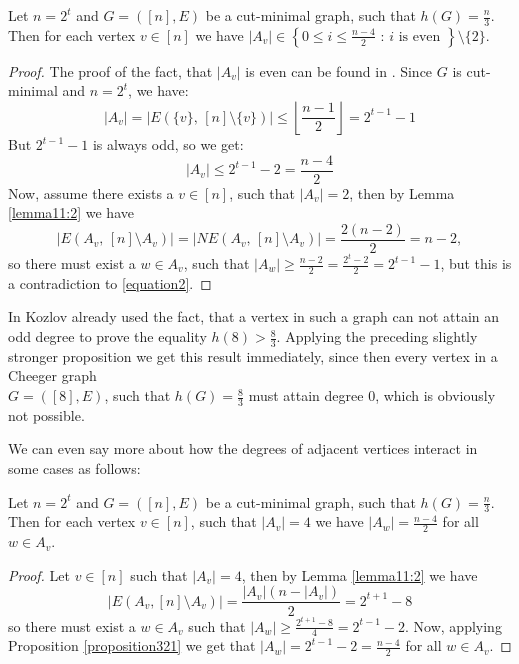 \begin{prop}\label{proposition321}
Let \(n=2^t\) and \(G=([n],E)\) be a cut-minimal graph, such that \(h(G)=\frac{n}{3}\). Then for each vertex \(v\in [n]\) we have \(|A_v|\in\left\{0\leq i\leq\frac{n-4}{2}\text{ : }i\text{ is even }\right\}\setminus\{2\}\).
\begin{proof}
The proof of the fact, that \(|A_v|\) is even can be found in \cite{1}. Since \(G\) is cut-minimal and \(n=2^t\), we have:
\[
|A_v|=|E(\{v\}\text{, }[n]\setminus\{v\})|\leq\left\lfloor\frac{n-1}{2}\right\rfloor=2^{t-1}-1
\]
But \(2^{t-1}-1\) is always odd, so we get:
\begin{equation}\label{equation2}
|A_v|\leq 2^{t-1}-2=\frac{n-4}{2}
\end{equation}
Now, assume there exists a \(v\in [n]\), such that \(|A_v|=2\), then by Lemma \ref{lemma11:2} we have
\[
|E(A_v\text{, }[n]\setminus A_v)|=|NE(A_v\text{, }[n]\setminus A_v)|=\frac{2(n-2)}{2}=n-2,
\]
so there must exist a \(w\in A_v\), such that \(|A_w|\geq\frac{n-2}{2}=\frac{2^t-2}{2}=2^{t-1}-1\), but this is a contradiction to \ref{equation2}.
\end{proof}
\end{prop}

\begin{expl}
In \cite{1} Kozlov already used the fact, that a vertex in such a graph can not attain an odd degree to prove the equality \(h(8)>\frac{8}{3}\). Applying the preceding slightly stronger proposition we get this result immediately, since then every vertex in a Cheeger graph\\
\(G=([8],E)\), such that \(h(G)=\frac{8}{3}\) must attain degree \(0\), which is obviously not possible.
\end{expl}

We can even say more about how the degrees of adjacent vertices interact in some cases as follows:

\begin{lem}
Let \(n=2^t\) and \(G=([n],E)\) be a cut-minimal graph, such that \(h(G)=\frac{n}{3}\). Then for each vertex \(v\in [n]\), such that \(|A_v|=4\) we have \(|A_w|=\frac{n-4}{2}\) for all \(w\in A_v\).
\begin{proof}
Let \(v\in [n]\) such that \(|A_v|=4\), then by Lemma \ref{lemma11:2} we have
\[
|E(A_v,[n]\setminus A_v)|=\frac{|A_v|(n-|A_v|)}{2}=2^{t+1}-8
\]
so there must exist a \(w\in A_v\) such that \(|A_w|\geq\frac{2^{t+1}-8}{4}=2^{t-1}-2\). Now, applying Proposition \ref{proposition321} we get that \(|A_w|=2^{t-1}-2=\frac{n-4}{2}\) for all \(w\in A_v\).

\end{proof}
\end{lem}